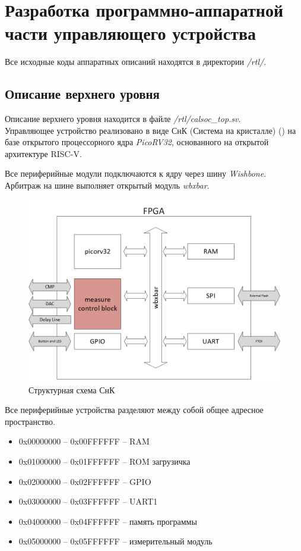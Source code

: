 \chapter{Разработка программно-аппаратной части управляющего устройства}

Все исходные коды аппаратных описаний находятся в директории \emph{/rtl/}.

\section{Описание верхнего уровня}

Описание верхнего уровня находится в файле \emph{/rtl/calsoc\_top.sv}.\\

Управляющее устройство реализовано в виде СнК (Система на кристалле) () на базе открытого процессорного
ядра \emph{PicoRV32}, основанного на открытой архитектуре RISC-V.

Все периферийные модули подключаются к ядру через шину \emph{Wishbone}. Арбитраж на шине выполняет открытый модуль
\emph{wbxbar}.

\begin{figure}[ht!] 
	\center
	\includegraphics [scale=0.7] {my_folder/images//calsoc}
	\caption{Структурная схема СнК} 
	\label{fig:calsoc}  
\end{figure}

Все периферийные устройства разделяют между собой общее адресное пространство.

\begin{itemize}[label={}]
	\item 0x00000000 -- 0x00FFFFFF -- RAM 
	\item 0x01000000 -- 0x01FFFFFF -- ROM загрузичка
	\item 0x02000000 -- 0x02FFFFFF -- GPIO
	\item 0x03000000 -- 0x03FFFFFF -- UART1
	\item 0x04000000 -- 0x04FFFFFF -- память программы
	\item 0x05000000 -- 0x05FFFFFF -- измерительный модуль
\end{itemize}



